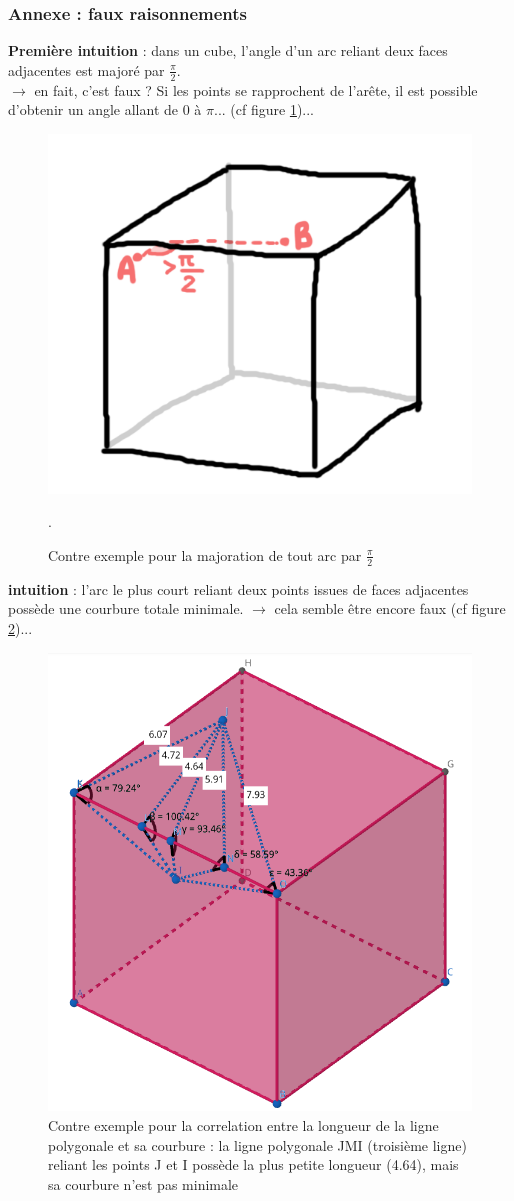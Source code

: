 \documentclass{article}
\begin{document}

\subsubsection{Annexe : faux raisonnements}
\textbf{Première intuition} : dans un cube, l'angle d'un arc reliant deux faces adjacentes est majoré par $\frac{\pi}{2}$.\\
$\rightarrow$ en fait, c'est faux ? Si les points se rapprochent de l'arête, il est possible d'obtenir un angle allant de 0 à $\pi$... (cf figure \ref{fig:contre_ex_0})...

\begin{figure}[!h]
    \centering
    \includegraphics[width=0.3\linewidth]{contre_ex_0.png}
    \caption{Contre exemple pour la majoration de tout arc par $\frac{\pi}{2}$}.
    \label{fig:contre_ex_0}
\end{figure}

\textbf{intuition} : l'arc le plus court reliant deux points issues de faces adjacentes possède une courbure totale minimale.
$\rightarrow$ cela semble être encore faux (cf figure \ref{fig:contre_ex_1})...

\begin{figure}[!h]
    \centering
    \includegraphics[width=0.5\linewidth]{contre_ex_1.png}
    \caption{Contre exemple pour la correlation entre la longueur de la ligne polygonale et sa courbure : la ligne polygonale JMI (troisième ligne) reliant les points J et I possède la plus petite longueur (4.64), mais sa courbure n'est pas minimale}
    \label{fig:contre_ex_1}
\end{figure}
\end{document}
